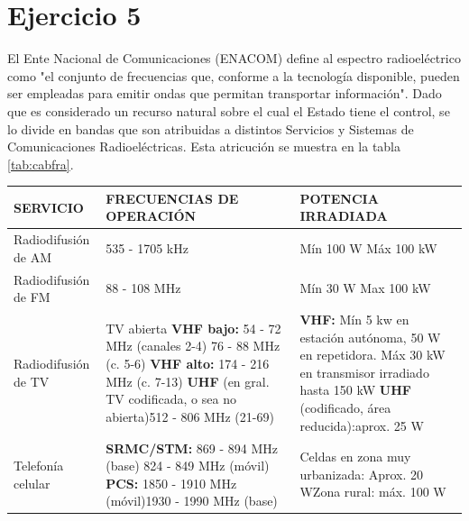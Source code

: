 \documentclass[../../labo_tp5_main.tex]{subfiles}
\begin{document}
\section{Ejercicio 5}

El Ente Nacional de Comunicaciones (ENACOM) define al espectro radioel\'ectrico como "el conjunto de frecuencias que, conforme a la tecnología disponible, pueden ser empleadas para emitir ondas que permitan transportar información". Dado que es considerado un recurso natural sobre el cual el Estado tiene el control, se lo divide en bandas que son atribuidas a distintos Servicios y Sistemas de Comunicaciones Radioel\'ectricas. Esta atricuci\'on se muestra en la tabla \ref{tab:cabfra}.

\begin{table}[H]
\begin{tabular}{|l|L{6cm}|L{6cm}|}
\hline
SERVICIO            & FRECUENCIAS DE OPERACIÓN                                                                                                                                                           & POTENCIA IRRADIADA                                                                                                                                 \\
\hline
Radiodifusión de AM & 535 - 1705 kHz                                                                                                                                                                     & Mín 100 W Máx 100 kW                                                                                                                               
\\
\hline
Radiodifusión de FM & 88 - 108 MHz                                                                                                                                                                       & Mín 30 W Max 100 kW                                                                                                                                \\
\hline
Radiodifusión de TV & TV abierta \textbf{VHF bajo:} 54 - 72 MHz (canales 2-4) 76 - 88 MHz (c. 5-6) \textbf{VHF alto:} 174 - 216 MHz (c. 7-13) \textbf{UHF} (en gral. TV codificada, o sea no abierta)512 - 806 MHz (21-69) & \textbf{VHF:} Mín 5 kw en estación autónoma, 50 W en repetidora. Máx 30 kW en transmisor irradiado hasta 150 kW \textbf{UHF} (codificado, área reducida):aprox. 25 W \\
\hline
Telefonía celular   & \textbf{SRMC/STM:} 869 - 894 MHz (base) 824 - 849 MHz (móvil) \textbf{PCS:} 1850 - 1910 MHz (móvil)1930 - 1990 MHz (base)                                                                            & Celdas en zona muy urbanizada: Aprox. 20 WZona rural: máx. 100 W                                                                                   \\

\end{tabular}
\end{table}
\end{document}
